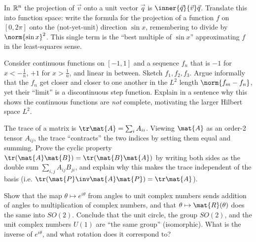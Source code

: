 \begin{exercise}
\label{ch37:ex-funproj}
In $\mathbb{R}^n$ the projection of $\vec{v}$ onto a unit vector $\vec{q}$ is
$\inner{\vec{q}}{\vec{v}}\vec{q}$. Translate this into function space: write the
formula for the projection of a function $f$ on $[0,2\pi]$ onto the (not-yet-unit)
direction $\sin x$, remembering to divide by $\norm{\sin x}^2$. This single term is
the ``best multiple of $\sin x$'' approximating $f$ in the least-squares sense.
\end{exercise}

\begin{exercise}
\label{ch37:ex-complete}
Consider continuous functions on $[-1,1]$ and a sequence $f_n$ that is $-1$ for
$x<-\tfrac1n$, $+1$ for $x>\tfrac1n$, and linear in between. Sketch $f_1,f_2,f_3$.
Argue informally that the $f_n$ get closer and closer to one another in the
$L^2$ length $\norm{f_m-f_n}$, yet their ``limit'' is a discontinuous step function.
Explain in a sentence why this shows the continuous functions are \emph{not}
complete, motivating the larger Hilbert space $L^2$.
\end{exercise}

\begin{exercise}
\label{ch37:ex-trace}
The trace of a matrix is $\tr\mat{A}=\sum_i A_{ii}$. Viewing $\mat{A}$ as an
order-2 tensor $A_{ij}$, the trace ``contracts'' the two indices by setting them
equal and summing. Prove the cyclic property $\tr(\mat{A}\mat{B})=\tr(\mat{B}\mat{A})$
by writing both sides as the double sum $\sum_{i,j}A_{ij}B_{ji}$, and explain why
this makes the trace independent of the basis (i.e. $\tr(\mat{P}\inv\mat{A}\mat{P})
=\tr\mat{A}$).
\end{exercise}

\begin{exercise}
\label{ch37:ex-u1}
Show that the map $\theta\mapsto e^{i\theta}$ from angles to unit complex numbers
sends addition of angles to multiplication of complex numbers, and that
$\theta\mapsto\mat{R}(\theta)$ does the same into $SO(2)$. Conclude that the unit
circle, the group $SO(2)$, and the unit complex numbers $U(1)$ are ``the same group''
(isomorphic). What is the inverse of $e^{i\theta}$, and what rotation does it
correspond to?
\end{exercise}
